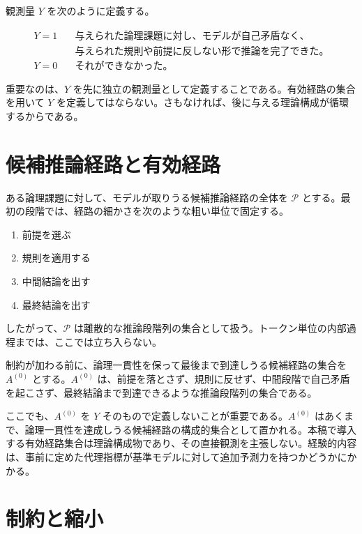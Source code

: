 \documentclass[12pt,a4paper]{article}
\begin{document}
観測量 $Y$ を次のように定義する。

\begin{align*}
Y = 1 &\quad\text{与えられた論理課題に対し、モデルが自己矛盾なく、} \\
       &\quad\text{与えられた規則や前提に反しない形で推論を完了できた。} \\[4pt]
Y = 0 &\quad\text{それができなかった。}
\end{align*}

重要なのは、$Y$ を先に独立の観測量として定義することである。有効経路の集合を用いて $Y$ を定義してはならない。さもなければ、後に与える理論構成が循環するからである。

\section{候補推論経路と有効経路}

ある論理課題に対して、モデルが取りうる候補推論経路の全体を $\mathcal{P}$ とする。最初の段階では、経路の細かさを次のような粗い単位で固定する。

\begin{enumerate}
  \item 前提を選ぶ
  \item 規則を適用する
  \item 中間結論を出す
  \item 最終結論を出す
\end{enumerate}

したがって、$\mathcal{P}$ は離散的な推論段階列の集合として扱う。トークン単位の内部過程までは、ここでは立ち入らない。

制約が加わる前に、論理一貫性を保って最後まで到達しうる候補経路の集合を $A^{(0)}$ とする。$A^{(0)}$ は、前提を落とさず、規則に反せず、中間段階で自己矛盾を起こさず、最終結論まで到達できるような推論段階列の集合である。

ここでも、$A^{(0)}$ を $Y$ そのもので定義しないことが重要である。$A^{(0)}$ はあくまで、論理一貫性を達成しうる候補経路の構成的集合として置かれる。本稿で導入する有効経路集合は理論構成物であり、その直接観測を主張しない。経験的内容は、事前に定めた代理指標が基準モデルに対して追加予測力を持つかどうかにかかる。

\section{制約と縮小}
\end{document}

